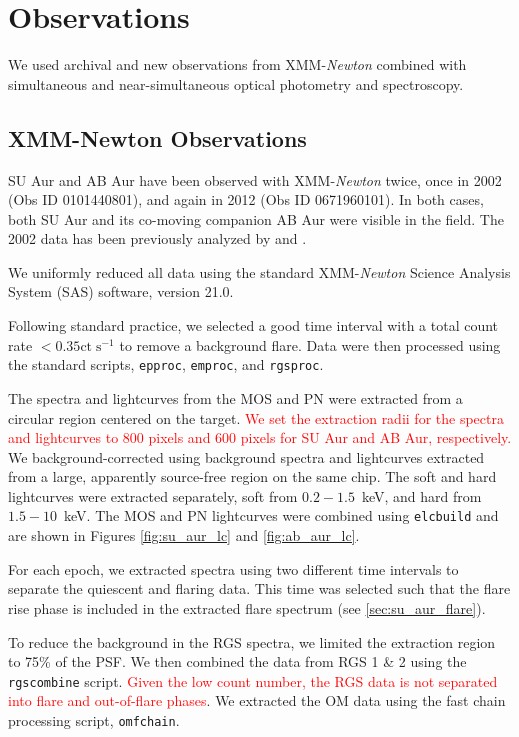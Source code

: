 \documentclass[twocolumn]{aastex631}
\newcommand{\xmm}{XMM-\textit{Newton}}
\newcommand{\red}[1]{\textcolor{red}{#1}}
\begin{document}
\section{Observations} \label{sec:observations}

We used archival and new observations from \xmm{} combined with simultaneous and near-simultaneous optical photometry and spectroscopy.

\subsection{XMM-Newton Observations}

SU Aur and AB Aur have been observed with \xmm{} twice, once in 2002 (Obs ID 0101440801), and again in 2012 (Obs ID 0671960101). In both cases, both SU Aur and its co-moving companion AB Aur were visible in the field. The 2002 data has been previously analyzed by \citet{robrade_xmm-newton_2006} and \citet{franciosini_xmm-newton_2007}.

We uniformly reduced all data using the standard \xmm{} Science Analysis System (SAS) software, version 21.0. 

Following standard practice, we selected a good time interval with a total count rate $<0.35 \mathrm{ct}\;\mathrm{s}^{-1}$ to remove a background flare. Data were then processed using the standard scripts, \texttt{epproc}, \texttt{emproc}, and \texttt{rgsproc}.

The spectra and lightcurves from the MOS and PN were extracted from a circular region centered on the target. \red{We set the extraction radii for the spectra and lightcurves to $800$ pixels and $600$ pixels for SU Aur and AB Aur, respectively.} We background-corrected using background spectra and lightcurves extracted from a large, apparently source-free region on the same chip. The soft and hard lightcurves were extracted separately, soft from $0.2 - 1.5$~keV, and hard from $1.5 - 10$~keV. The MOS and PN lightcurves were combined using \texttt{elcbuild} and are shown in Figures \ref{fig:su_aur_lc} and \ref{fig:ab_aur_lc}. 

For each epoch, we extracted spectra using two different time intervals to separate the quiescent and flaring data. This time was selected such that the flare rise phase is included in the extracted flare spectrum (see \ref{sec:su_aur_flare}). 

To reduce the background in the RGS spectra, we limited the extraction region to 75\% of the PSF. We then combined the data from RGS 1 \& 2 using the \texttt{rgscombine} script. \red{Given the low count number, the RGS data is not separated into flare and out-of-flare phases}. %
We extracted the OM data using the fast chain processing script, \texttt{omfchain}.
\end{document}
